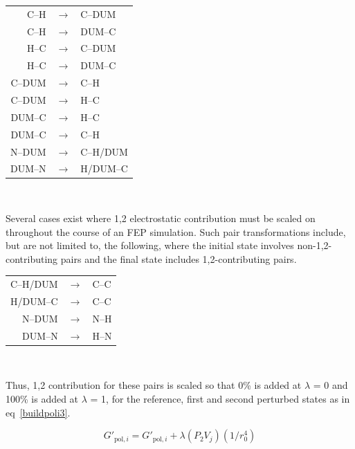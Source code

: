 \documentclass[12pt]{report}
\def\equlab{eq}\def\equslab{Eqs.}
\newcommand*\eq[1]{\equlab~\ref{#1}}
\begin{document}
\vspace*{.4cm}
\begin{singlespace}
{\centering
\begin{tabular}{rcl}
C--H   & $\longrightarrow$ & C--DUM \\
C--H   & $\longrightarrow$ & DUM--C \\
H--C   & $\longrightarrow$ & C--DUM \\
H--C   & $\longrightarrow$ & DUM--C \\
C--DUM & $\longrightarrow$ & C--H \\
C--DUM & $\longrightarrow$ & H--C \\
DUM--C & $\longrightarrow$ & H--C \\
DUM--C & $\longrightarrow$ & C--H \\
N--DUM & $\longrightarrow$ & C--H/DUM \\
DUM--N & $\longrightarrow$ & H/DUM--C \\
\end{tabular}\\}
\end{singlespace}\vspace*{.7cm}

Several cases exist where 1,2 electrostatic contribution must be scaled on throughout the course of an FEP simulation. Such pair transformations include, but are not limited to, the following, where the initial state involves non-1,2-contributing pairs and the final state includes 1,2-contributing pairs.

\vspace*{.5cm}
\begin{singlespace}
{\centering
\begin{tabular}{rcl}
C--H/DUM & $\longrightarrow$ & C--C \\
H/DUM--C & $\longrightarrow$ & C--C \\
N--DUM   & $\longrightarrow$ & N--H \\
DUM--N   & $\longrightarrow$ & H--N \\
\end{tabular}\\}
\end{singlespace}\vspace*{.7cm}

Thus, 1,2 contribution for these pairs is scaled so that 0\% is added at $\lambda$ = 0 and 100\% is added at $\lambda$ = 1, for the reference, first and second perturbed states as in \eq{buildpoli3}.

\begin{equation}
\label{buildpoli3}
G'_{ \textrm{pol},i} = G'_{ \textrm{pol},i} + \lambda(P_{2}V_{j})(1/r^{4}_{0})
\end{equation}
\vspace*{-0.4cm}
\end{document}
